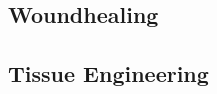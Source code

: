 \documentclass[12pt]{cheatsheet}
\begin{document}
\subsection*{Woundhealing}

\subsection*{Tissue Engineering}




\end{document}
